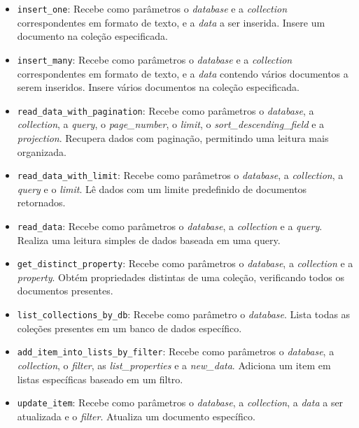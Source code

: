 \begin{itemize}
    \item \texttt{insert\_one}: Recebe como parâmetros o \textit{database} e a \textit{collection} correspondentes em formato de texto, e a \textit{data} a ser inserida. Insere um documento na coleção especificada.
    
    \item \texttt{insert\_many}: Recebe como parâmetros o \textit{database} e a \textit{collection} correspondentes em formato de texto, e a \textit{data} contendo vários documentos a serem inseridos. Insere vários documentos na coleção especificada.
    
    \item \texttt{read\_data\_with\_pagination}: Recebe como parâmetros o \textit{database}, a \textit{collection}, a \textit{query}, o \textit{page\_number}, o \textit{limit}, o \textit{sort\_descending\_field} e a \textit{projection}. Recupera dados com paginação, permitindo uma leitura mais organizada.
    
    \item \texttt{read\_data\_with\_limit}: Recebe como parâmetros o \textit{database}, a \textit{collection}, a \textit{query} e o \textit{limit}. Lê dados com um limite predefinido de documentos retornados.
    
    \item \texttt{read\_data}: Recebe como parâmetros o \textit{database}, a \textit{collection} e a \textit{query}. Realiza uma leitura simples de dados baseada em uma query.
    
    \item \texttt{get\_distinct\_property}: Recebe como parâmetros o \textit{database}, a \textit{collection} e a \textit{property}. Obtém propriedades distintas de uma coleção, verificando todos os documentos presentes.
    
    \item \texttt{list\_collections\_by\_db}: Recebe como parâmetro o \textit{database}. Lista todas as coleções presentes em um banco de dados específico.
    
    \item \texttt{add\_item\_into\_lists\_by\_filter}: Recebe como parâmetros o \textit{database}, a \textit{collection}, o \textit{filter}, as \textit{list\_properties} e a \textit{new\_data}. Adiciona um item em listas específicas baseado em um filtro.
    
    \item \texttt{update\_item}: Recebe como parâmetros o \textit{database}, a \textit{collection}, a \textit{data} a ser atualizada e o \textit{filter}. Atualiza um documento específico.
    

\end{itemize}
